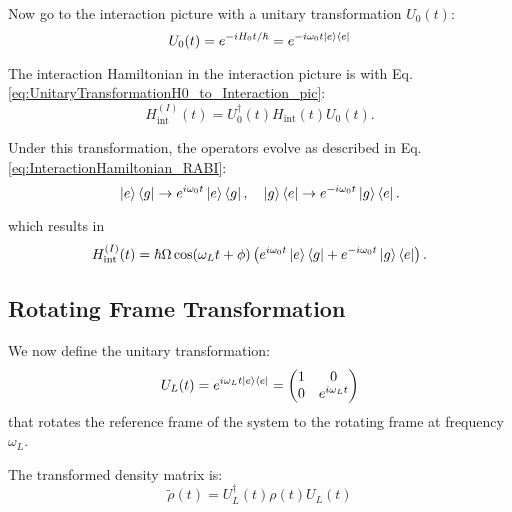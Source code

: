 Now go to the interaction picture with a unitary transformation \( U_0(t) \):
\begin{equation}
	U_0(t) = e^{-i H_0 t / \hbar} = e^{-i \omega_0 t \ket{e}\bra{e}}
	\label{eq:UnitaryTransformationH0_to_Interaction_pic}
\end{equation}

The interaction Hamiltonian in the interaction picture is with Eq. \eqref{eq:UnitaryTransformationH0_to_Interaction_pic}:
\begin{equation}
	H_{\text{int}}^{(I)}(t) = U_0^\dagger(t) H_{\text{int}}(t) U_0(t).
	\label{eq:InteractionHamiltonianInteractionPicture}
\end{equation}

Under this transformation, the operators evolve as described in Eq. \eqref{eq:InteractionHamiltonian_RABI}:
\begin{equation}
	\ket{e}\bra{g} \rightarrow e^{i\omega_0 t} \ket{e}\bra{g}, \quad
	\ket{g}\bra{e} \rightarrow e^{-i\omega_0 t} \ket{g}\bra{e}.
	\label{eq:OperatorEvolution}
\end{equation}

which results in
\begin{equation}
	H_{\text{int}}^{(I)}(t) = \hbar\Omega \cos(\omega_L t + \phi)\left(e^{i\omega_0 t} \ket{e}\bra{g} + e^{-i\omega_0 t} \ket{g}\bra{e} \right).
	\label{eq:InteractionHamiltonianTransformed}
\end{equation}

\subsection*{Rotating Frame Transformation}

We now define the unitary transformation:
\begin{equation}
	U_L(t) = e^{i \omega_L t \ket{e}\bra{e}} =
	\begin{pmatrix}
		1 & 0               \\
		0 & e^{i\omega_L t}
	\end{pmatrix}
	\label{eq:UnitaryTransformation}
\end{equation}
that rotates the reference frame of the system to the rotating frame at frequency \(\omega_L\).

The transformed density matrix is:
\begin{equation}
	\tilde{\rho}(t) = U_L^\dagger(t) \rho(t) U_L(t)
	\label{eq:TransformedDensityMatrix}
\end{equation}

